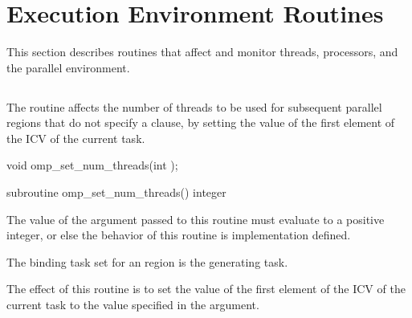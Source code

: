 \section{Execution Environment Routines}
\label{sec:Execution Environment Routines}
This section describes routines that affect and monitor threads, processors, and the 
parallel environment. 






\subsection{}
\label{subsec:omp_set_num_threads}
\summary
The  routine affects the number of threads to be used for 
subsequent parallel regions that do not specify a  clause, by setting the 
value of the first element of the  ICV of the current task.

\format
\ccppspecificstart
\begin{boxedcode}
void omp\_set\_num\_threads(int );
\end{boxedcode}
\ccppspecificend

\fortranspecificstart
\begin{boxedcode}
subroutine omp\_set\_num\_threads()
integer 
\end{boxedcode}
\fortranspecificend

\constraints
The value of the argument passed to this routine must evaluate to a positive integer, or 
else the behavior of this routine is implementation defined.

\binding
The binding task set for an  region is the generating task.

\effect
The effect of this routine is to set the value of the first element of the  ICV 
of the current task to the value specified in the argument. 

